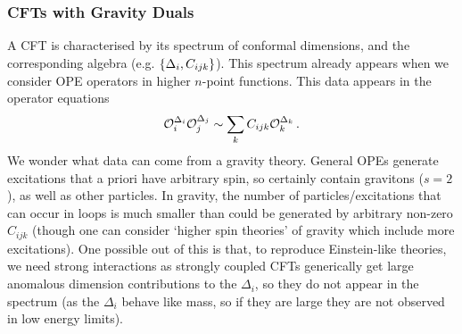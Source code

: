 \documentclass{article}
\begin{document}
\subsubsection{CFTs with Gravity Duals} 
A CFT is characterised by its spectrum of conformal dimensions, and the corresponding algebra (e.g. $\left\{ \Delta_i, C_{ijk} \right\}$). This spectrum already appears when we consider OPE operators in higher $n$-point functions. This data appears in the operator equations 
\[
\mathcal{O}_i^{\Delta_i} \mathcal{O}_j^{\Delta_j} \sim \sum_k C_{ijk} \mathcal{O}_k^{\Delta_k} \, .
\]
We wonder what data can come from a gravity theory. General OPEs generate excitations that a priori have arbitrary spin, so certainly contain gravitons ($s=2$), as well as other particles. In gravity, the number of particles/excitations that can occur in loops is much smaller than could be generated by arbitrary non-zero $C_{ijk}$ (though one can consider `higher spin theories' of gravity which include more excitations). One possible out of this is that, to reproduce Einstein-like theories, we need strong interactions as strongly coupled CFTs generically get large anomalous dimension contributions to the $\Delta_i$, so they do not appear in the spectrum (as the $\Delta_i$ behave like mass, so if they are large they are not observed in low energy limits). 

\end{document}
